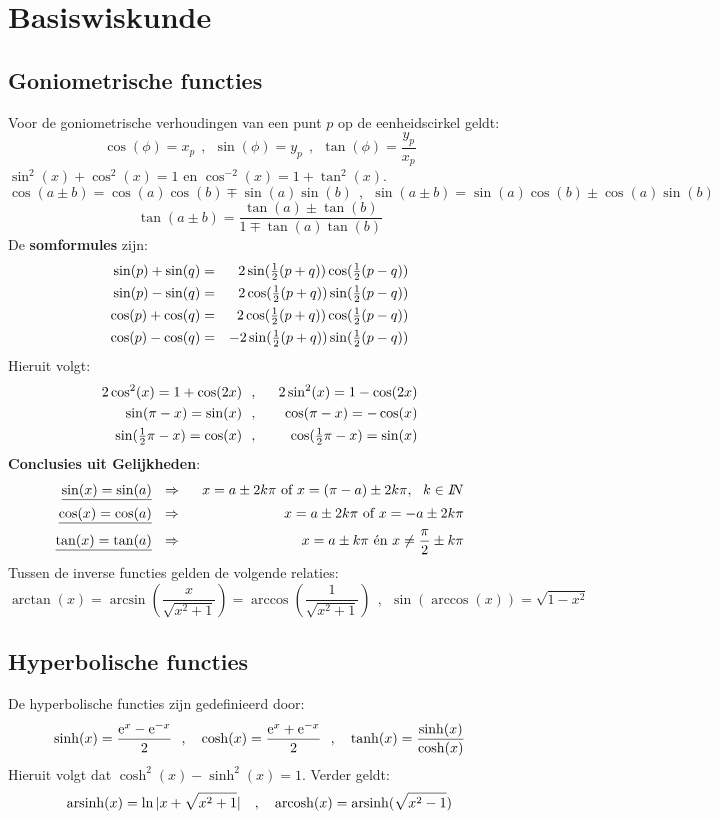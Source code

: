 \chapter{Basiswiskunde}
\section{Goniometrische functies}
Voor de goniometrische verhoudingen van een punt $p$ op de eenheidscirkel geldt:
\[
\cos(\phi)=x_p~~,~~\sin(\phi)=y_p~~,~~\tan(\phi)=\frac{y_p}{x_p}
\]
$\sin^2(x)+\cos^2(x)=1$ en $\cos^{-2}(x)=1+\tan^2(x)$.
\[
\cos(a\pm b)=\cos(a)\cos(b)\mp\sin(a)\sin(b)~~,~~
\sin(a\pm b)=\sin(a)\cos(b)\pm\cos(a)\sin(b)
\]
\[
\tan(a\pm b)=\frac{\tan(a)\pm\tan(b)}{1\mp\tan(a)\tan(b)}
\]
De {\bf somformules} zijn:
\begin{eqnarray*}
\sin(p)+\sin(q)&=&2\sin(\mbox{$\frac{1}{2}$}(p+q))\cos(\mbox{$\frac{1}{2}$}(p-q))\\
\sin(p)-\sin(q)&=&2\cos(\mbox{$\frac{1}{2}$}(p+q))\sin(\mbox{$\frac{1}{2}$}(p-q))\\
\cos(p)+\cos(q)&=&2\cos(\mbox{$\frac{1}{2}$}(p+q))\cos(\mbox{$\frac{1}{2}$}(p-q))\\
\cos(p)-\cos(q)&=&-2\sin(\mbox{$\frac{1}{2}$}(p+q))\sin(\mbox{$\frac{1}{2}$}(p-q))\\
\end{eqnarray*}
Hieruit volgt:
\begin{eqnarray*}
2\cos^2(x)=1+\cos(2x)   &~~,~~&2\sin^2(x)=1-\cos(2x)\\
\sin(\pi-x)=\sin(x)     &~~,~~&\cos(\pi-x)=-\cos(x)\\
\sin(\mbox{$\frac{1}{2}$}\pi-x)=\cos(x)&~~,~~&\cos(\mbox{$\frac{1}{2}$}\pi-x)=\sin(x)
\end{eqnarray*}
{\bf Conclusies uit Gelijkheden}:
\begin{eqnarray*}
\underline{\sin(x)=\sin(a)}&~~\Rightarrow~~&x=a\pm2k\pi\mbox{ of }x=(\pi-a)\pm2k\pi,~~k\in I\hspace{-1mm}N\\
\underline{\cos(x)=\cos(a)}&~~\Rightarrow~~&x=a\pm2k\pi\mbox{ of }x=-a\pm2k\pi\\
\underline{\tan(x)=\tan(a)}&~~\Rightarrow~~&x=a\pm k\pi\mbox{ \'en }x\neq\frac{\pi}{2}\pm k\pi
\end{eqnarray*}
Tussen de inverse functies gelden de volgende relaties:
\[
\arctan(x)=\arcsin\left(\frac{x}{\sqrt{x^2+1}}\right)=\arccos\left(\frac{1}{\sqrt{x^2+1}}\right)~~,~~
\sin(\arccos(x))=\sqrt{1-x^2}
\]

\section{Hyperbolische functies}
De hyperbolische functies zijn gedefinieerd door:
\[
\sinh(x)=\frac{{\rm e}^x-{\rm e}^{-x}}{2}~~,~~~\cosh(x)=\frac{{\rm e}^x+{\rm e}^{-x}}{2}~~,~~~\tanh(x)=\frac{\sinh(x)}{\cosh(x)}
\]
Hieruit volgt dat $\cosh^2(x)-\sinh^2(x)=1$. Verder geldt:
\[
{\rm arsinh}(x)=\ln|x+\sqrt{x^2+1}|~~~,~~~{\rm arcosh}(x)={\rm arsinh}(\sqrt{x^2-1})
\]

